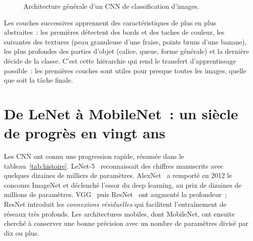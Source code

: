\begin{figure}[H]
\centering
{}
\caption{Architecture générale d’un CNN de classification d’images.}\label{fig:archi}
\end{figure}

Les couches successives apprennent des caractéristiques de plus en plus abstraites~: les premières détectent des bords et des taches de couleur, les suivantes des textures (peau granuleuse d’une fraise, points bruns d’une banane), les plus profondes des parties d’objet (calice, queue, forme générale) et la dernière décide de la classe. C’est cette hiérarchie qui rend le transfert d’apprentissage possible~: les premières couches sont utiles pour presque toutes les images, quelle que soit la tâche finale.

\section{De LeNet à MobileNet~: un siècle de progrès en vingt ans}

Les CNN ont connu une progression rapide, résumée dans le tableau~\ref{tab:histoire}. LeNet-5~\cite{lecun1998} reconnaissait des chiffres manuscrits avec quelques dizaines de milliers de paramètres. AlexNet~\cite{krizhevsky2012} a remporté en 2012 le concours ImageNet et déclenché l’essor du deep learning, au prix de dizaines de millions de paramètres. VGG~\cite{simonyan2015} puis ResNet~\cite{he2016} ont augmenté la profondeur~; ResNet introduit les \emph{connexions résiduelles} qui facilitent l’entraînement de réseaux très profonds. Les architectures mobiles, dont MobileNet, ont ensuite cherché à conserver une bonne précision avec un nombre de paramètres divisé par dix ou plus.

